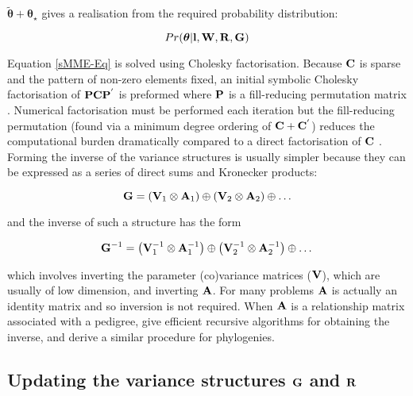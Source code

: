 \documentclass{article}
\begin{document}
$\tilde{\bm  \theta} + {\bm \theta}_{\star}$ gives a realisation from the required probability distribution:

\begin{equation}
Pr({\bm \theta} | {\bf l}, {\bf W}, {\bf R}, {\bf G})
\end{equation}

Equation \ref{sMME-Eq} is solved using Cholesky factorisation. Because ${\bf C}$ is sparse and the pattern of non-zero elements fixed, an initial symbolic Cholesky factorisation of ${\bf P}{\bf C}{\bf P}^{'}$ is preformed where ${\bf P}$ is a fill-reducing permutation matrix  \citep{Davis.2006}. Numerical factorisation must be performed each iteration but the fill-reducing permutation (found via a minimum degree ordering of ${\bf C}+{\bf C}^{'}$) reduces the computational burden dramatically compared to a direct factorisation of ${\bf C}$  \citep{Davis.2006}.\\

Forming the inverse of the variance structures is usually simpler because they can be expressed as a series of direct sums and Kronecker products:

\begin{equation}
{\bf G}= \left({\bf V}_{1}\otimes{\bf A}_{1}\right) \oplus \left({\bf V}_{2}\otimes{\bf A}_{2}\right) \oplus \ldots
\label{G3-Eq}
\end{equation}

and the inverse of such a structure has the form 

\begin{equation}
{\bf G}^{-1} = \left({\bf V}^{-1}_{1}\otimes{\bf A}^{-1}_{1}\right) \oplus \left({\bf V}^{-1}_{2}\otimes{\bf A}^{-1}_{2}\right) \oplus \ldots\\
\end{equation}

which involves inverting the parameter (co)variance matrices (${\bf V}$), which are usually of low dimension, and inverting ${\bf A}$. For many problems ${\bf A}$ is actually an identity matrix and so inversion is not required.  When ${\bf A}$ is a relationship matrix associated with a pedigree, \citet{Henderson.1976, Meuwissen.1992} give efficient recursive algorithms for obtaining the inverse, and \citet{Hadfield.2010b} derive a similar procedure for phylogenies.
 
\subsection[Updating the variance structures]{Updating the variance structures ${\bf G}$ and ${\bf R}$}
\end{document}
